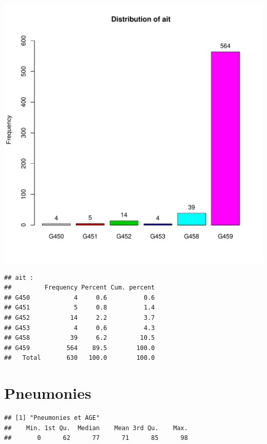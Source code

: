\documentclass[12pt,english,french,twoside]{report}\usepackage[]{graphicx}\usepackage[]{color}
\makeatletter
\def\maxwidth{ %
  \ifdim\Gin@nat@width>\linewidth
    \linewidth
  \else
    \Gin@nat@width
  \fi
}
\newenvironment{kframe}{%
 \def\at@end@of@kframe{}%
 \ifinner\ifhmode%
  \def\at@end@of@kframe{\end{minipage}}%
  \begin{minipage}{\columnwidth}%
 \fi\fi%
 \def\FrameCommand##1{\hskip\@totalleftmargin \hskip-\fboxsep
 \colorbox{shadecolor}{##1}\hskip-\fboxsep
     \hskip-\linewidth \hskip-\@totalleftmargin \hskip\columnwidth}%
 \MakeFramed {\advance\hsize-\width
   \@totalleftmargin\z@ \linewidth\hsize
   \@setminipage}}%
 {\par\unskip\endMakeFramed%
 \at@end@of@kframe}
\newenvironment{knitrout}{}{} %
\makeatother
\begin{document}
\begin{knitrout}
\color{fgcolor}
\includegraphics[width=\maxwidth]{figure/ait} 
\begin{kframe}\begin{verbatim}
## ait :  
##         Frequency Percent Cum. percent
## G450            4     0.6          0.6
## G451            5     0.8          1.4
## G452           14     2.2          3.7
## G453            4     0.6          4.3
## G458           39     6.2         10.5
## G459          564    89.5        100.0
##   Total       630   100.0        100.0
\end{verbatim}
\end{kframe}
\end{knitrout}


\section{Pneumonies}

\begin{knitrout}
\color{fgcolor}\begin{kframe}


{\ttfamily\noindent\color{warningcolor}{\#\# Warning: impossible d'ouvrir le fichier '../mes\_fonctions.R' : Aucun fichier ou dossier de ce type}}

{\ttfamily\noindent\bfseries\color{errorcolor}{\#\# Error: impossible d'ouvrir la connexion}}\begin{verbatim}
## [1] "Pneumonies et AGE"
##    Min. 1st Qu.  Median    Mean 3rd Qu.    Max. 
##       0      62      77      71      85      98
\end{verbatim}
\end{kframe}
\end{knitrout}
\end{document}
